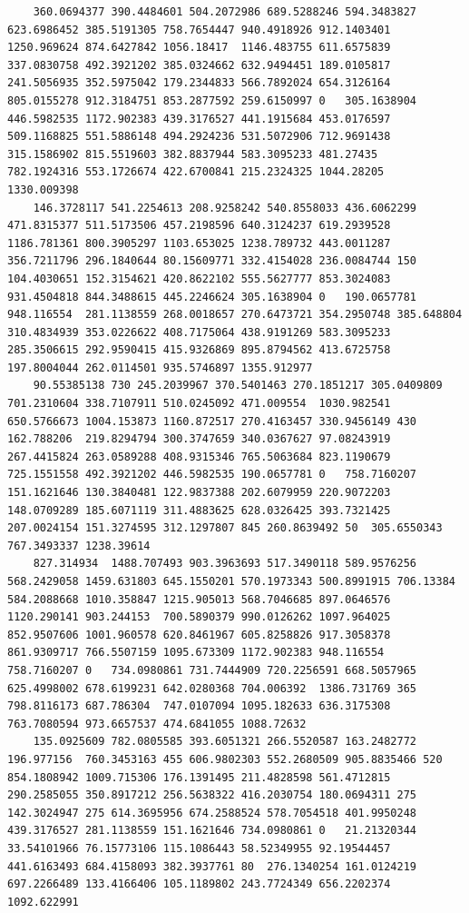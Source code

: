 \documentclass[UTF8]{ctexart}
\begin{document}
\begin{lstlisting}
	360.0694377	390.4484601	504.2072986	689.5288246	594.3483827	623.6986452	385.5191305	758.7654447	940.4918926	912.1403401	1250.969624	874.6427842	1056.18417	1146.483755	611.6575839	337.0830758	492.3921202	385.0324662	632.9494451	189.0105817	241.5056935	352.5975042	179.2344833	566.7892024	654.3126164	805.0155278	912.3184751	853.2877592	259.6150997	0	305.1638904	446.5982535	1172.902383	439.3176527	441.1915684	453.0176597	509.1168825	551.5886148	494.2924236	531.5072906	712.9691438	315.1586902	815.5519603	382.8837944	583.3095233	481.27435	782.1924316	553.1726674	422.6700841	215.2324325	1044.28205	1330.009398
	146.3728117	541.2254613	208.9258242	540.8558033	436.6062299	471.8315377	511.5173506	457.2198596	640.3124237	619.2939528	1186.781361	800.3905297	1103.653025	1238.789732	443.0011287	356.7211796	296.1840644	80.15609771	332.4154028	236.0084744	150	104.4030651	152.3154621	420.8622102	555.5627777	853.3024083	931.4504818	844.3488615	445.2246624	305.1638904	0	190.0657781	948.116554	281.1138559	268.0018657	270.6473721	354.2950748	385.648804	310.4834939	353.0226622	408.7175064	438.9191269	583.3095233	285.3506615	292.9590415	415.9326869	895.8794562	413.6725758	197.8004044	262.0114501	935.5746897	1355.912977
	90.55385138	730	245.2039967	370.5401463	270.1851217	305.0409809	701.2310604	338.7107911	510.0245092	471.009554	1030.982541	650.5766673	1004.153873	1160.872517	270.4163457	330.9456149	430	162.788206	219.8294794	300.3747659	340.0367627	97.08243919	267.4415824	263.0589288	408.9315346	765.5063684	823.1190679	725.1551558	492.3921202	446.5982535	190.0657781	0	758.7160207	151.1621646	130.3840481	122.9837388	202.6079959	220.9072203	148.0709289	185.6071119	311.4883625	628.0326425	393.7321425	207.0024154	151.3274595	312.1297807	845	260.8639492	50	305.6550343	767.3493337	1238.39614
	827.314934	1488.707493	903.3963693	517.3490118	589.9576256	568.2429058	1459.631803	645.1550201	570.1973343	500.8991915	706.13384	584.2088668	1010.358847	1215.905013	568.7046685	897.0646576	1120.290141	903.244153	700.5890379	990.0126262	1097.964025	852.9507606	1001.960578	620.8461967	605.8258826	917.3058378	861.9309717	766.5507159	1095.673309	1172.902383	948.116554	758.7160207	0	734.0980861	731.7444909	720.2256591	668.5057965	625.4998002	678.6199231	642.0280368	704.006392	1386.731769	365	798.8116173	687.786304	747.0107094	1095.182633	636.3175308	763.7080594	973.6657537	474.6841055	1088.72632
	135.0925609	782.0805585	393.6051321	266.5520587	163.2482772	196.977156	760.3453163	455	606.9802303	552.2680509	905.8835466	520	854.1808942	1009.715306	176.1391495	211.4828598	561.4712815	290.2585055	350.8917212	256.5638322	416.2030754	180.0694311	275	142.3024947	275	614.3695956	674.2588524	578.7054518	401.9950248	439.3176527	281.1138559	151.1621646	734.0980861	0	21.21320344	33.54101966	76.15773106	115.1086443	58.52349955	92.19544457	441.6163493	684.4158093	382.3937761	80	276.1340254	161.0124219	697.2266489	133.4166406	105.1189802	243.7724349	656.2202374	1092.622991

\end{lstlisting}
\end{document}
